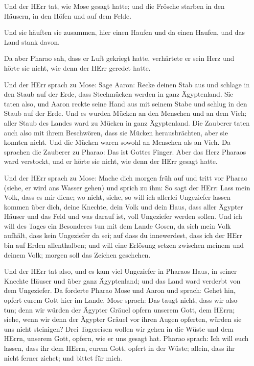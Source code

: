  Und der HErr tat, wie Mose gesagt hatte; und die Frösche
starben in den Häusern, in den Höfen und auf dem Felde.

 Und sie häuften sie zusammen, hier einen Haufen und da
einen Haufen, und das Land stank davon.

 Da aber Pharao sah, dass er Luft gekriegt hatte,
verhärtete er sein Herz und hörte sie nicht, wie denn der HErr geredet
hatte.

 Und der HErr sprach zu Mose: Sage Aaron: Recke deinen Stab
aus und schlage in den Staub auf der Erde, dass Stechmücken werden in
ganz Ägyptenland.  Sie taten also, und Aaron reckte seine
Hand aus mit seinem Stabe und schlug in den Staub auf der Erde. Und es
wurden Mücken an den Menschen und an dem Vieh; aller Staub des Landes
ward zu Mücken in ganz Ägyptenland.  Die Zauberer taten
auch also mit ihrem Beschwören, dass sie Mücken herausbrächten, aber sie
konnten nicht. Und die Mücken waren sowohl an Menschen als an Vieh.
 Da sprachen die Zauberer zu Pharao: Das ist Gottes Finger.
Aber das Herz Pharaos ward verstockt, und er hörte sie nicht, wie denn
der HErr gesagt hatte.

 Und der HErr sprach zu Mose: Mache dich morgen früh auf
und tritt vor Pharao (siehe, er wird ans Wasser gehen) und sprich zu
ihm: So sagt der HErr: Lass mein Volk, dass es mir diene; 
wo nicht, siehe, so will ich allerlei Ungeziefer lassen kommen über
dich, deine Knechte, dein Volk und dein Haus, dass aller Ägypter Häuser
und das Feld und was darauf ist, voll Ungeziefer werden sollen.
 Und ich will des Tages ein Besonderes tun mit dem Lande
Gosen, da sich mein Volk aufhält, dass kein Ungeziefer da sei; auf dass
du innewerdest, dass ich der HErr bin auf Erden allenthalben;
 und will eine Erlösung setzen zwischen meinem und deinem
Volk; morgen soll das Zeichen geschehen.

 Und der HErr tat also, und es kam viel Ungeziefer in
Pharaos Haus, in seiner Knechte Häuser und über ganz Ägyptenland; und
das Land ward verderbt von dem Ungeziefer.  Da forderte
Pharao Mose und Aaron und sprach: Gehet hin, opfert eurem Gott hier im
Lande.  Mose sprach: Das taugt nicht, dass wir also tun;
denn wir würden der Ägypter Gräuel opfern unserem Gott, dem HErrn;
siehe, wenn wir denn der Ägypter Gräuel vor ihren Augen opferten, würden
sie uns nicht steinigen?  Drei Tagereisen wollen wir gehen
in die Wüste und dem HErrn, unserem Gott, opfern, wie er uns gesagt hat.
 Pharao sprach: Ich will euch lassen, dass ihr dem HErrn,
eurem Gott, opfert in der Wüste; allein, dass ihr nicht ferner ziehet;
und bittet für mich.

